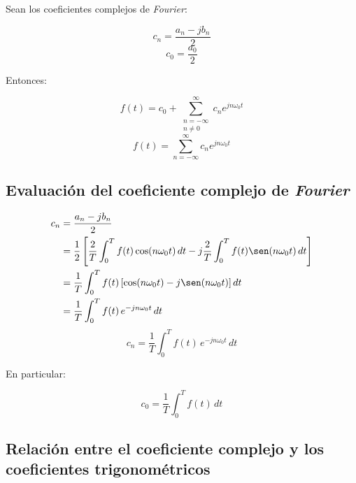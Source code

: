 Sean los coeficientes complejos de \emph{Fourier}:

\begin{equation*}
    c_n=\frac{a_n-jb_n}{2}
\end{equation*}
\begin{equation*}
    c_0=\frac{a_0}{2}
\end{equation*}

Entonces:

\begin{equation*}
    f(t)=c_0+\sum_{\substack{n=-\infty\\n\neq0}}^{\infty}c_n e^{jn\omega_0 t}
\end{equation*}
\begin{equation}
    f(t)=\sum_{n=-\infty}^{\infty}c_n e^{jn\omega_0 t}
\end{equation}

\subsection{Evaluación del coeficiente complejo de \emph{Fourier}}

\begin{equation*}
\begin{split}
    c_n
        &=\frac{a_n-jb_n}{2}\\
        &=\frac{1}{2}\left[\frac{2}{T}\int_0^T f(t)\cos(n\omega_0 t)\,dt-j\frac{2}{T}\int_0^T f(t)\sen(n\omega_0 t)\,dt\right]\\
        &=\frac{1}{T}\int_0^T f(t)\left[\cos(n\omega_0 t)-j\sen(n\omega_0 t)\right]dt\\
        &=\frac{1}{T}\int_0^T f(t)\,e^{-jn\omega_0 t}\,dt\\
\end{split}
\end{equation*}
\begin{equation}
    c_n=\frac{1}{T}\int_0^T f(t)\,e^{-jn\omega_0 t}\,dt
\end{equation}

En particular:

\begin{equation}
    c_0=\frac{1}{T}\int_0^T f(t)\,dt
\end{equation}

\subsection{Relación entre el coeficiente complejo y los coeficientes trigonométricos}

